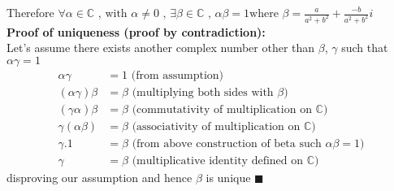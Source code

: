\documentclass{article}
\begin{document}
Therefore $\forall \alpha \in \mathbb{C} \textrm{ , with } \alpha \neq 0
\textrm{ , } \exists \beta \in \mathbb{C} \textrm{ , } \alpha\beta =1 \textrm{
  where } \beta = \frac{a}{a^2 + b^2} + \frac{-b}{a^2 + b^2}i$ \\
\textbf{Proof of uniqueness (proof by contradiction):}\\
Let's assume there exists another complex number other than $\beta$, $\gamma$ such that
$\alpha\gamma=1$
\begin{align*}
  \alpha\gamma &= 1 \textrm{ (from assumption)} \\
  (\alpha\gamma)\beta &= \beta \textrm{ (multiplying both sides with $\beta$)} \\
  (\gamma\alpha)\beta &= \beta \textrm{ (commutativity of multiplication on $\mathbb{C}$)}\\
  \gamma(\alpha\beta) &= \beta \textrm{ (associativity of multiplication on $\mathbb{C}$)}\\
  \gamma.1 &= \beta \textrm{ (from above construction of beta such $\alpha\beta = 1$)} \\
  \gamma &= \beta  \textrm{ (multiplicative identity defined on $\mathbb{C}$)}
\end{align*}
disproving our assumption and hence $\beta$ is unique $\blacksquare$
\end{document}
